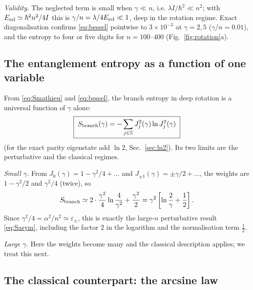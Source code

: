 \documentclass[preprint,12pt]{elsarticle}
\newcommand{\Erel}{E_{\rm rel}}
\begin{document}
\emph{Validity.} The neglected term is small when $\gamma\ll n$, i.e.
$\lambda I/\hbar^{2}\ll n^{2}$; with $\Erel\simeq\hbar^{2}n^{2}/4I$ this is
$\gamma/n=\lambda/4\Erel\ll1$, deep in the rotation regime. Exact
diagonalisation confirms \eqref{eq:bessel} pointwise to $3\times10^{-3}$ at
$\gamma=2,5$ ($\gamma/n=0.01$), and the entropy to four or five digits for
$n=100$--$400$ (Fig.~\ref{fig:rotation}a).

\subsection{The entanglement entropy as a function of one variable}

From \eqref{eq:Smathieu} and \eqref{eq:bessel}, the branch entropy in deep
rotation is a universal function of $\gamma$ alone:
\begin{equation}
\boxed{\;S_{\rm branch}(\gamma)=-\sum_{j\in\mathbb{Z}}J_{j}^{2}(\gamma)\ln
J_{j}^{2}(\gamma)\;}
\label{eq:SB}
\end{equation}
(for the exact parity eigenstate add $\ln2$, Sec.~\ref{sec:ln2}). Its two limits
are the perturbative and the classical regimes.

\emph{Small $\gamma$.} From $J_{0}(\gamma)=1-\gamma^{2}/4+\dots$ and
$J_{\pm1}(\gamma)=\pm\gamma/2+\dots$, the weights are
$1-\gamma^{2}/2$ and $\gamma^{2}/4$ (twice), so
\begin{equation}
S_{\rm branch}\simeq2\cdot\frac{\gamma^{2}}{4}\ln\frac{4}{\gamma^{2}}
+\frac{\gamma^{2}}{2}=\gamma^{2}\left[\ln\frac{2}{\gamma}+\frac12\right].
\end{equation}
Since $\gamma^{2}/4=\alpha^{2}/n^{2}\simeq\varepsilon_{\pm}$, this is exactly the
large-$n$ perturbative result \eqref{eq:Sasym}, including the factor $2$ in the
logarithm and the normalisation term $\tfrac12$.

\emph{Large $\gamma$.} Here the weights become many and the classical
description applies; we treat this next.

\subsection{The classical counterpart: the arcsine law}
\end{document}
